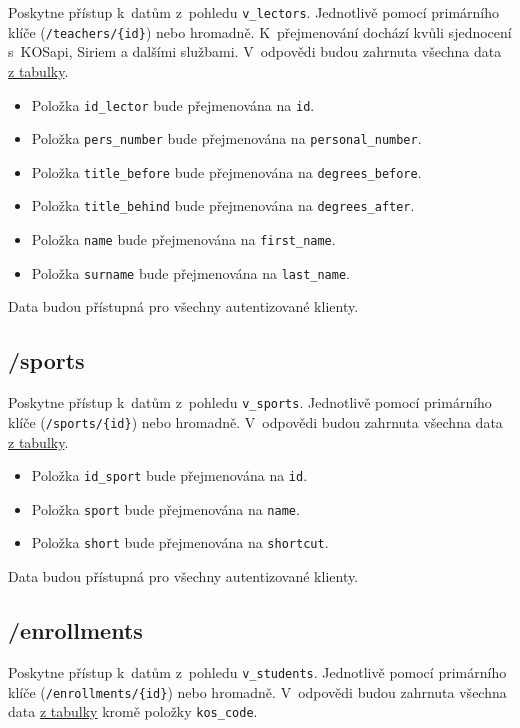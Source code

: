 Poskytne přístup k~datům z~pohledu \verb!v_lectors!. Jednotlivě pomocí primárního klíče (\verb!/teachers/{id}!) nebo hromadně. K~přejmenování dochází kvůli sjednocení s~KOSapi, Siriem a dalšími službami. V~odpovědi budou zahrnuta všechna data \protect\hyperlink{tab:lectors}{z tabulky}.

\begin{itemize}
\tightlist
\item
  Položka \verb!id_lector! bude přejmenována na \verb!id!.
\item
  Položka \verb!pers_number! bude přejmenována na \verb!personal_number!.
\item
  Položka \verb!title_before! bude přejmenována na \verb!degrees_before!.
\item
  Položka \verb!title_behind! bude přejmenována na \verb!degrees_after!.
\item
  Položka \verb!name! bude přejmenována na \verb!first_name!.
\item
  Položka \verb!surname! bude přejmenována na \verb!last_name!.
\end{itemize}

Data budou přístupná pro všechny autentizované klienty.

\subsection{/sports}\label{sports}

Poskytne přístup k~datům z~pohledu \verb!v_sports!. Jednotlivě pomocí primárního klíče (\verb!/sports/{id}!) nebo hromadně. V~odpovědi budou zahrnuta všechna data \protect\hyperlink{tab:sports}{z tabulky}.

\begin{itemize}
\tightlist
\item
  Položka \verb!id_sport! bude přejmenována na \verb!id!.
\item
  Položka \verb!sport! bude přejmenována na \verb!name!.
\item
  Položka \verb!short! bude přejmenována na \verb!shortcut!.
\end{itemize}

Data budou přístupná pro všechny autentizované klienty.

\subsection{/enrollments}\label{enrollments}

Poskytne přístup k~datům z~pohledu \verb!v_students!. Jednotlivě pomocí primárního klíče (\verb!/enrollments/{id}!) nebo hromadně. V~odpovědi budou zahrnuta všechna data \protect\hyperlink{tab:students}{z tabulky} kromě položky \verb!kos_code!.

